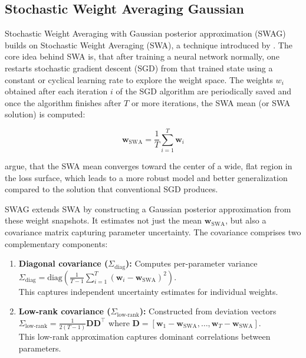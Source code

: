 \subsection{Stochastic Weight Averaging Gaussian}
\label{methodology:swag}
Stochastic Weight Averaging with Gaussian posterior approximation (SWAG) builds on Stochastic Weight
Averaging (SWA), a technique introduced by \citet{izmailov2019swa}. The core idea behind SWA is,
that after training a neural network normally, one restarts stochastic gradient descent (SGD) from that
trained state using a constant or cyclical learning rate to explore the weight space. The weights $w_i$
obtained after each iteration $i$ of the SGD algorithm are periodically saved and once the algorithm
finishes after $T$ or more iterations, the SWA mean (or SWA solution) is computed:

\[
\mathbf{w}_{\mathrm{SWA}} = \frac{1}{T}\sum_{i=1}^T \mathbf{w}_i
\]

\citet{izmailov2019swa} argue, that the SWA mean converges toward the center of a wide, flat region in
the loss surface, which leads to a more robust model and better generalization compared to the solution
that conventional SGD produces.

\vspace{0.15cm}
SWAG \citep{maddox2019swag} extends SWA by constructing a Gaussian posterior approximation from these
weight snapshots. It estimates not just the mean $\mathbf{w}_{\mathrm{SWA}}$, but also a covariance
matrix capturing parameter uncertainty. The covariance comprises two complementary components:

\begin{enumerate}
    \item \textbf{Diagonal covariance ($\Sigma_{\mathrm{diag}}$):} Computes per-parameter variance\\
    $\Sigma_{\mathrm{diag}} = \mathrm{diag}\left(\frac{1}{T-1}\sum_{i=1}^T (\mathbf{w}_i - \mathbf{w}_{\mathrm{SWA}})^2\right)$.\\
    This captures independent uncertainty estimates for individual weights.
          
    \item \textbf{Low-rank covariance ($\Sigma_{\mathrm{low\text{-}rank}}$):} Constructed from deviation
    vectors\\
    $\Sigma_{\mathrm{low\text{-}rank}} = \frac{1}{2(T-1)}\mathbf{D}\mathbf{D}^\top$  
    where $\mathbf{D} = [\mathbf{w}_1 - \mathbf{w}_{\mathrm{SWA}}, \dots, \mathbf{w}_T - \mathbf{w}_{\mathrm{SWA}}]$.\\
    This low-rank approximation captures dominant correlations between parameters.
\end{enumerate}

